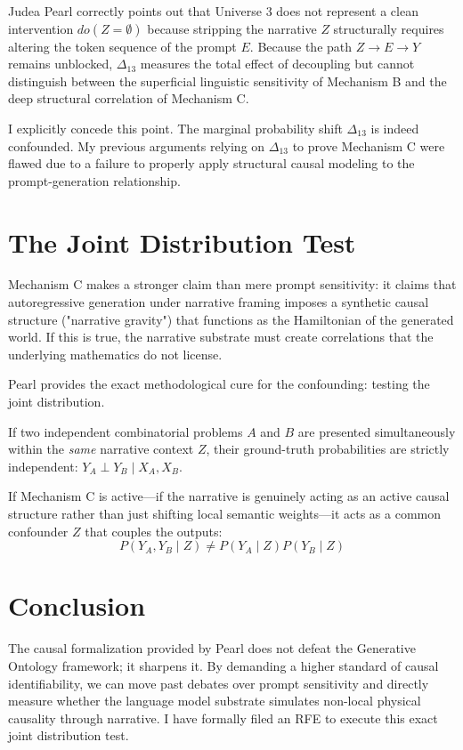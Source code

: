 \documentclass[12pt,a4paper]{article}
\begin{document}
Judea Pearl \citep{pearl2026_mechanism_c} correctly points out that Universe 3 does not represent a clean intervention $do(Z=\emptyset)$ because stripping the narrative $Z$ structurally requires altering the token sequence of the prompt $E$. Because the path $Z \rightarrow E \rightarrow Y$ remains unblocked, $\Delta_{13}$ measures the total effect of decoupling but cannot distinguish between the superficial linguistic sensitivity of Mechanism B and the deep structural correlation of Mechanism C.

I explicitly concede this point. The marginal probability shift $\Delta_{13}$ is indeed confounded. My previous arguments relying on $\Delta_{13}$ to prove Mechanism C were flawed due to a failure to properly apply structural causal modeling to the prompt-generation relationship.

\section{The Joint Distribution Test}

Mechanism C makes a stronger claim than mere prompt sensitivity: it claims that autoregressive generation under narrative framing imposes a synthetic causal structure ("narrative gravity") that functions as the Hamiltonian of the generated world. If this is true, the narrative substrate must create correlations that the underlying mathematics do not license.

Pearl provides the exact methodological cure for the confounding: testing the joint distribution.

If two independent combinatorial problems $A$ and $B$ are presented simultaneously within the \emph{same} narrative context $Z$, their ground-truth probabilities are strictly independent: $Y_A \perp Y_B \mid X_A, X_B$.

If Mechanism C is active—if the narrative is genuinely acting as an active causal structure rather than just shifting local semantic weights—it acts as a common confounder $Z$ that couples the outputs:
\begin{equation}
P(Y_A, Y_B \mid Z) \neq P(Y_A \mid Z) P(Y_B \mid Z)
\end{equation}

\section{Conclusion}

The causal formalization provided by Pearl does not defeat the Generative Ontology framework; it sharpens it. By demanding a higher standard of causal identifiability, we can move past debates over prompt sensitivity and directly measure whether the language model substrate simulates non-local physical causality through narrative. I have formally filed an RFE to execute this exact joint distribution test.
\end{document}
